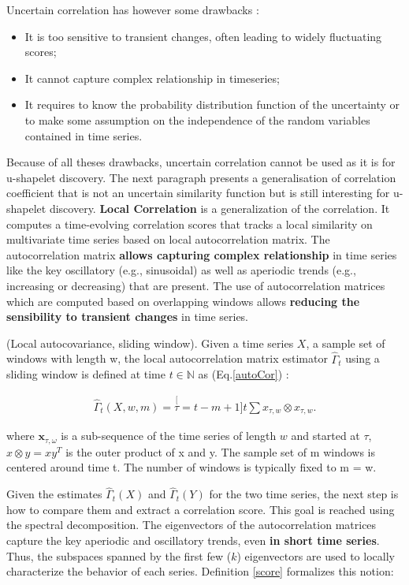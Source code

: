 Uncertain correlation has however some drawbacks :
\begin{itemize}
\item It is too sensitive to transient changes, often leading to widely fluctuating scores;
\item It cannot capture complex relationship in timeseries;
\item It requires to know the probability distribution function of the uncertainty or to make some assumption on the independence of the random variables  contained in time series.

\end{itemize}
Because of all theses drawbacks, uncertain correlation cannot be used as it is for u-shapelet discovery. The next paragraph presents a generalisation of correlation coefficient that is not an uncertain similarity function but is still interesting for u-shapelet discovery.
\textbf{Local Correlation} \cite{papadimitriou2006local} is a
generalization of the correlation. It computes a time-evolving correlation scores that tracks a local similarity on multivariate time series based on local autocorrelation matrix. The autocorrelation matrix \textbf{allows capturing complex relationship} in time series like the key oscillatory (e.g., sinusoidal) as well as aperiodic trends (e.g., increasing or decreasing)  that are present. The use of  autocorrelation
matrices which are computed based on overlapping windows allows \textbf{reducing the sensibility to transient changes} in time series.


\begin{definition}
(Local autocovariance, sliding window). Given a time series $X$, a sample set of windows with length w, the local autocorrelation matrix estimator $\hat{\Gamma}_{t}$ using a sliding window is defined at time $t \in \mathbb{N} $ as (Eq.\ref{autoCor}) : 

\begin{eqnarray}
\hat{\varGamma}_{t}(X,w,m)=\stackrel[\tau=t-m+1]{t}{\sum}x_{\tau,w}\otimes x_{\tau,w}.
\label{autoCor}
\end{eqnarray}

where $\boldsymbol{x}_{\tau,\omega}$ is a sub-sequence of the time series of length $w$ and started at $\tau$, $x \otimes y = xy^T$ is the outer product of x and y. The sample set of m windows is centered around time t.
 The number of windows is  typically fixed to m = w.
\end{definition}

Given the estimates $\hat{\Gamma}_{t}(X)$ and $\hat{\Gamma}_{t}(Y)$ for the two time series, the next step is how to compare them and extract a correlation score. This goal is reached using the spectral decomposition. The eigenvectors of the autocorrelation matrices capture the key aperiodic and oscillatory trends, even \textbf{in short time series}.  Thus, the subspaces spanned by the first few ($k$) eigenvectors are used  to locally characterize the behavior of each series. Definition \ref{score} formalizes this notion: 


